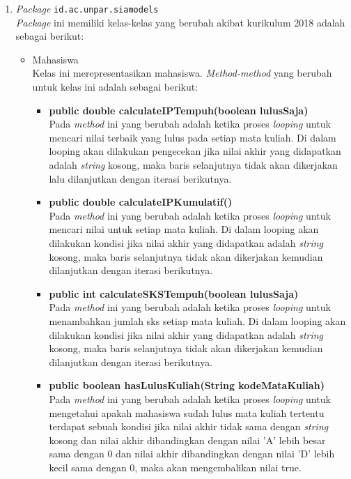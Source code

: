 \begin{enumerate}
	\item \textit{Package} \texttt{id.ac.unpar.siamodels}\\
	\textit{Package} ini memiliki kelas-kelas yang berubah akibat kurikulum 2018 adalah sebagai berikut:
	\begin{itemize}
			\item Mahasiswa\\
				Kelas ini merepresentasikan mahasiswa. \textit{Method-method} yang berubah untuk kelas ini adalah sebagai berikut:
				\begin{itemize}
					\item \textbf{public double calculateIPTempuh(boolean lulusSaja)}\\
						Pada \textit{method} ini yang berubah adalah ketika proses \textit{looping} untuk mencari nilai terbaik yang lulus pada setiap mata kuliah. Di dalam looping akan dilakukan pengecekan jika nilai akhir yang didapatkan adalah \textit{string} kosong, maka baris selanjutnya tidak akan dikerjakan lalu dilanjutkan dengan iterasi berikutnya.
					
					\item \textbf{public double calculateIPKumulatif()}\\
						Pada \textit{method} ini yang berubah adalah ketika proses \textit{looping} untuk mencari nilai untuk setiap mata kuliah. Di dalam looping akan dilakukan kondisi jika nilai akhir yang didapatkan adalah \textit{string} kosong, maka baris selanjutnya tidak akan dikerjakan kemudian dilanjutkan dengan iterasi berikutnya.
					
					\item \textbf{public int calculateSKSTempuh(boolean lulusSaja)}\\
						Pada \textit{method} ini yang berubah adalah ketika proses \textit{looping} untuk menambahkan jumlah sks setiap mata kuliah. Di dalam looping akan dilakukan kondisi jika nilai akhir yang didapatkan adalah \textit{string} kosong, maka baris selanjutnya tidak akan dikerjakan kemudian dilanjutkan dengan iterasi berikutnya.
					
					\item \textbf{public boolean hasLulusKuliah(String kodeMataKuliah)}\\
						Pada \textit{method} ini yang berubah adalah ketika proses \textit{looping} untuk mengetahui apakah mahasiswa sudah lulus mata kuliah tertentu terdapat sebuah kondisi jika nilai akhir tidak sama dengan \textit{string} kosong dan nilai akhir dibandingkan dengan nilai 'A' lebih besar sama dengan 0 dan nilai akhir dibandingkan dengan nilai 'D' lebih kecil sama dengan 0, maka akan mengembalikan nilai true.
		\end{itemize}
			

\end{itemize}
\end{enumerate}
